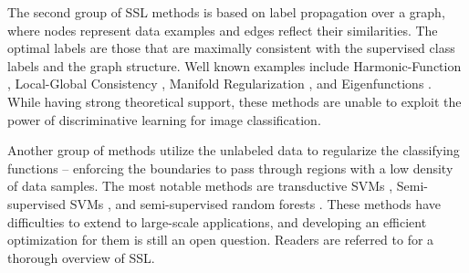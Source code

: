 The second group of SSL methods is based on label propagation over a
graph, where nodes represent data examples and edges reflect their
similarities. The optimal labels are those that are maximally
consistent with the supervised class labels and the graph
structure. Well known examples include Harmonic-Function
\citep{Zhu:Harmonic:03}, Local-Global Consistency \citep{Zhou:nips:04},
Manifold Regularization \citep{Belkin:semiframe:2006}, and
Eigenfunctions \citep{Fergus09}. While having strong theoretical
support, these methods are unable to exploit the power of
discriminative learning for image classification.

Another group of methods utilize the unlabeled data to regularize the
classifying functions -- enforcing the boundaries to pass through
regions with a low density of data samples. The most notable methods
are transductive SVMs \citep{Joachims:1999}, Semi-supervised
SVMs \citep{SemiSVM}, and semi-supervised random
forests \citep{SemiForest}. These methods have difficulties to extend to
large-scale applications, and developing an efficient optimization for
them is still an open question.  Readers are referred
to \citep{Zhu:ISL:2009} for a thorough overview of SSL.





